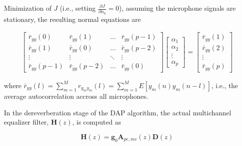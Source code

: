 Minimization of $J$ (i.e., setting $\frac{\partial J}{\partial \alpha_k} = 0$), assuming the microphone signals are stationary, the resulting normal equations are

\begin{eqnarray}
	\begin{bmatrix}
		\bar{r}_{yy}(0) & \bar{r}_{yy}(1) & \dots & \bar{r}_{yy}(p-1) \\
		\bar{r}_{yy}(1) & \bar{r}_{yy}(0) & \dots & \bar{r}_{yy}(p-2) \\
		\vdots               & \vdots              & \ddots & \vdots \\
		\bar{r}_{yy}(p-1) & \bar{r}_{yy}(p-2) & \dots & \bar{r}_{yy}(0)
	\end{bmatrix}
	\begin{bmatrix}
		\alpha_1 \\
		\alpha_2 \\
		\vdots \\
		\alpha_p
	\end{bmatrix} =
	\begin{bmatrix}
		\bar{r}_{yy}(1)  \\
		\bar{r}_{yy}(2)  \\
		\vdots \\
		\bar{r}_{yy}(p) 
	\end{bmatrix}
\end{eqnarray}

\noindent
where $\bar{r}_{yy}(l) = \sum_{m=1}^{M} r_{y_m y_m}(l) = \sum_{m=1}^{M} E[ y_m(n) y_m(n-l) ]$, i.e., the average autocorrelation accross all microphones.

In the dereverberation stage of the DAP algorithm, the actual multichannel equalizer filter, $\boldsymbol{H}(z)$, is computed as 

\begin{equation}
	\boldsymbol{H}(z) = \boldsymbol{g}_0 \boldsymbol{A}_{pe,mc}(z) \boldsymbol{D}(z)
\end{equation}

